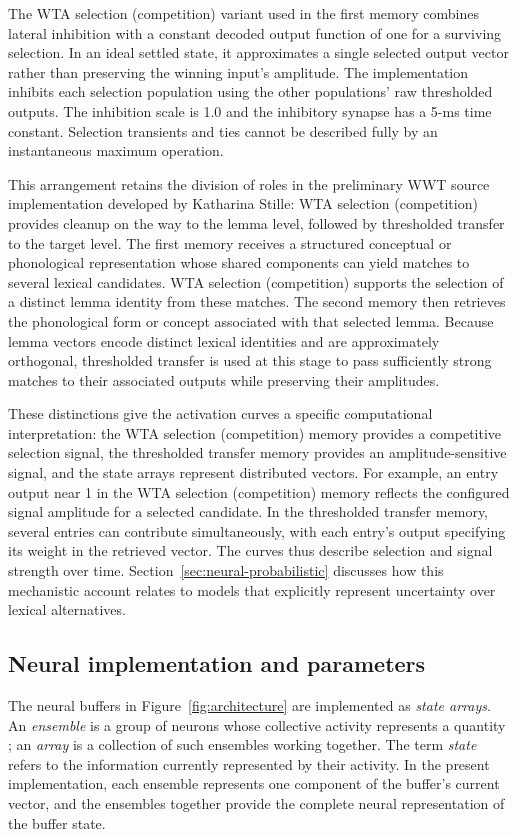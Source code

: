 The WTA selection (competition) variant used in the first memory combines lateral inhibition with a constant decoded output function of one for a surviving selection. In an ideal settled state, it approximates a single selected output vector rather than preserving the winning input's amplitude. The implementation inhibits each selection population using the other populations' raw thresholded outputs. The inhibition scale is 1.0 and the inhibitory synapse has a 5-ms time constant. Selection transients and ties cannot be described fully by an instantaneous maximum operation.

This arrangement retains the division of roles in the preliminary WWT source implementation developed by Katharina Stille: WTA selection (competition) provides cleanup on the way to the lemma level, followed by thresholded transfer to the target level. The first memory receives a structured conceptual or phonological representation whose shared components can yield matches to several lexical candidates. WTA selection (competition) supports the selection of a distinct lemma identity from these matches. The second memory then retrieves the phonological form or concept associated with that selected lemma. Because lemma vectors encode distinct lexical identities and are approximately orthogonal, thresholded transfer is used at this stage to pass sufficiently strong matches to their associated outputs while preserving their amplitudes.

These distinctions give the activation curves a specific computational interpretation: the WTA selection (competition) memory provides a competitive selection signal, the thresholded transfer memory provides an amplitude-sensitive signal, and the state arrays represent distributed vectors. For example, an entry output near 1 in the WTA selection (competition) memory reflects the configured signal amplitude for a selected candidate. In the thresholded transfer memory, several entries can contribute simultaneously, with each entry's output specifying its weight in the retrieved vector. The curves thus describe selection and signal strength over time. Section~\ref{sec:neural-probabilistic} discusses how this mechanistic account relates to models that explicitly represent uncertainty over lexical alternatives.

\subsection{Neural implementation and parameters}
\label{sec:neural-implementation}
The neural buffers in Figure~\ref{fig:architecture} are implemented as \emph{state arrays}. An \emph{ensemble} is a group of neurons whose collective activity represents a quantity \citep{eliasmith2003}; an \emph{array} is a collection of such ensembles working together. The term \emph{state} refers to the information currently represented by their activity. In the present implementation, each ensemble represents one component of the buffer's current vector, and the ensembles together provide the complete neural representation of the buffer state.

